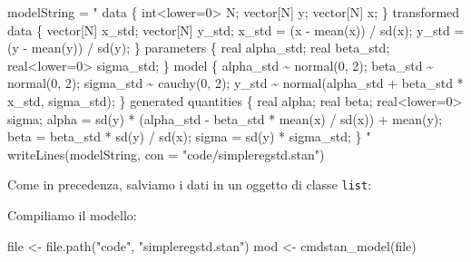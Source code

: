 \documentclass[
  10pt,
  italian,
  a4paper,
  extrafontsizes,onecolumn,openright
  ]{memoir}
\newenvironment{Shaded}{\begin{snugshade}}{\end{snugshade}}
\newcommand{\AttributeTok}[1]{\textcolor[rgb]{0.77,0.63,0.00}{#1}}
\newcommand{\FunctionTok}[1]{\textcolor[rgb]{0.00,0.00,0.00}{#1}}
\newcommand{\NormalTok}[1]{#1}
\newcommand{\OtherTok}[1]{\textcolor[rgb]{0.56,0.35,0.01}{#1}}
\newcommand{\SpecialCharTok}[1]{\textcolor[rgb]{0.00,0.00,0.00}{#1}}
\newcommand{\StringTok}[1]{\textcolor[rgb]{0.31,0.60,0.02}{#1}}
\begin{document}
\begin{Shaded}
\begin{Highlighting}[]
\NormalTok{modelString }\OtherTok{=} \StringTok{"}
\StringTok{data \{}
\StringTok{  int\textless{}lower=0\textgreater{} N;}
\StringTok{  vector[N] y;}
\StringTok{  vector[N] x;}
\StringTok{\}}
\StringTok{transformed data \{}
\StringTok{  vector[N] x\_std;}
\StringTok{  vector[N] y\_std;}
\StringTok{  x\_std = (x {-} mean(x)) / sd(x);}
\StringTok{  y\_std = (y {-} mean(y)) / sd(y);}
\StringTok{\}}
\StringTok{parameters \{}
\StringTok{  real alpha\_std;}
\StringTok{  real beta\_std;}
\StringTok{  real\textless{}lower=0\textgreater{} sigma\_std;}
\StringTok{\}}
\StringTok{model \{}
\StringTok{  alpha\_std \textasciitilde{} normal(0, 2);}
\StringTok{  beta\_std \textasciitilde{} normal(0, 2);}
\StringTok{  sigma\_std \textasciitilde{} cauchy(0, 2);}
\StringTok{  y\_std \textasciitilde{} normal(alpha\_std + beta\_std * x\_std, sigma\_std);}
\StringTok{\}}
\StringTok{generated quantities \{}
\StringTok{  real alpha;}
\StringTok{  real beta;}
\StringTok{  real\textless{}lower=0\textgreater{} sigma;}
\StringTok{  alpha = sd(y) * (alpha\_std {-} beta\_std * mean(x) / sd(x))}
\StringTok{           + mean(y);}
\StringTok{  beta = beta\_std * sd(y) / sd(x);}
\StringTok{  sigma = sd(y) * sigma\_std;}
\StringTok{\}}
\StringTok{"}
\FunctionTok{writeLines}\NormalTok{(modelString, }\AttributeTok{con =} \StringTok{"code/simpleregstd.stan"}\NormalTok{)}
\end{Highlighting}
\end{Shaded}

\noindent
Come in precedenza, salviamo i dati in un oggetto di classe \texttt{list}:

\begin{Shaded}
\end{Shaded}

\noindent
Compiliamo il modello:

\begin{Shaded}
\begin{Highlighting}[]
\NormalTok{file }\OtherTok{\textless{}{-}} \FunctionTok{file.path}\NormalTok{(}\StringTok{"code"}\NormalTok{, }\StringTok{"simpleregstd.stan"}\NormalTok{)}
\NormalTok{mod }\OtherTok{\textless{}{-}} \FunctionTok{cmdstan\_model}\NormalTok{(file)}
\end{Highlighting}
\end{Shaded}
\end{document}
